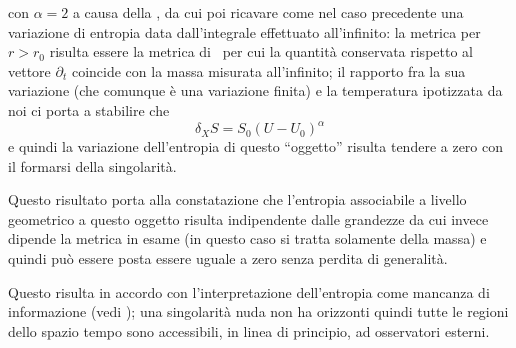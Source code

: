 con $\alpha=2$ a causa della \Energia, da cui poi ricavare come nel caso precedente una variazione di entropia data dall'in\-te\-gra\-le effettuato all'infinito: la metrica per $r>r_0$ risulta essere la metrica di \Sch\ per cui la quantit\`a conservata rispetto al vettore $\partial_t$ coincide con la massa misurata all'infinito; il rapporto fra la sua variazione (che comunque \`e una variazione finita) e la temperatura ipotizzata da noi ci porta a stabilire che
$$
\delta_X S=S_0\left(U-U_0\right)^\alpha
$$
e quindi la variazione dell'entropia di questo ``oggetto'' risulta tendere a zero con il formarsi della singolarit\`a.
\par
Questo risultato porta alla constatazione che l'entropia associabile a livello geometrico a questo oggetto  risulta indipendente dalle grandezze da cui invece dipende la metrica in esame (in questo caso si tratta solamente della massa) e quindi pu\`o essere posta essere uguale a zero senza perdita di generalit\`a. 
\par
Questo risulta in accordo con l'interpretazione dell'entropia come mancanza di in\-for\-ma\-zio\-ne (vedi ); una singolarit\`a nuda non ha orizzonti quindi tutte le regioni dello spazio tempo sono accessibili, in linea di principio, ad osservatori esterni.
